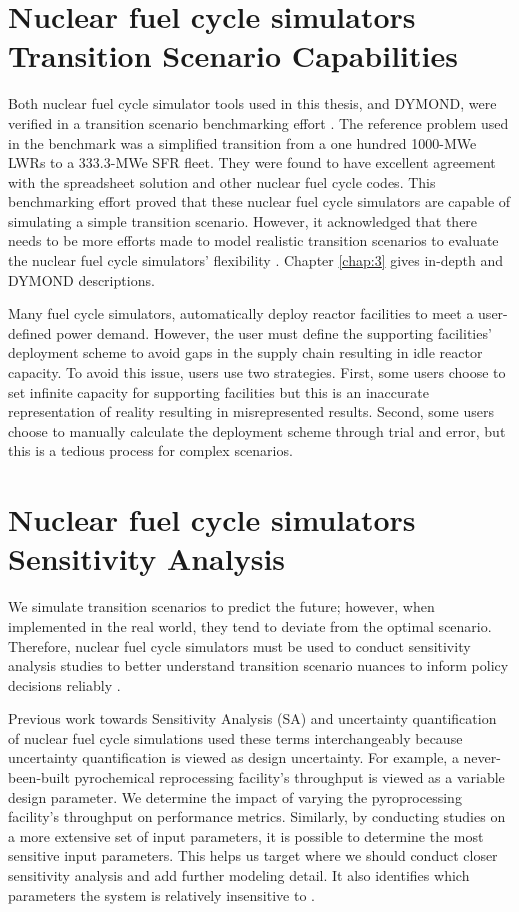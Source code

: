 \section{Nuclear fuel cycle simulators Transition Scenario Capabilities}
Both nuclear fuel cycle simulator tools used in this thesis, \Cyclus and DYMOND,
were verified in a transition scenario benchmarking effort
\cite{feng_standardized_2016,bae_standardized_2019}.
The reference problem used in the benchmark was a simplified 
transition from a one hundred 1000-MWe \glspl{LWR} to a 
333.3-MWe \gls{SFR} fleet. 
They were found to have excellent agreement with the 
spreadsheet solution and other nuclear fuel cycle codes.  
This benchmarking effort proved that these nuclear fuel cycle simulators
are capable of simulating a simple transition scenario. 
However, it acknowledged that there needs to be more efforts 
made to model realistic transition scenarios to evaluate
the nuclear fuel cycle simulators' flexibility \cite{feng_standardized_2016}.
Chapter \ref{chap:3} gives in-depth \Cyclus and DYMOND descriptions.

Many fuel cycle simulators, automatically deploy reactor facilities 
to meet a user-defined power demand. 
However, the user must define the supporting facilities' 
deployment scheme to avoid gaps in the supply 
chain resulting in idle reactor capacity. 
To avoid this issue, users use two strategies. 
First, some users choose to set infinite capacity 
for supporting facilities but this is an inaccurate 
representation of reality resulting in misrepresented results. 
Second, some users choose to manually calculate the deployment 
scheme through trial and error, but this is a tedious process 
for complex scenarios. 

\section{Nuclear fuel cycle simulators Sensitivity Analysis}
We simulate transition scenarios to predict the future; 
however, when implemented in the real world, they tend to deviate 
from the optimal scenario.
Therefore, nuclear fuel cycle simulators must be used to conduct
sensitivity analysis studies to better understand 
transition scenario nuances to inform policy decisions reliably
\cite{passerini_systematic_2014}. 

Previous work towards Sensitivity Analysis (SA) and uncertainty quantification of 
nuclear fuel cycle simulations used these terms interchangeably
because uncertainty quantification is viewed as design uncertainty.
For example, a never-been-built pyrochemical reprocessing 
facility's throughput is viewed as a variable design parameter.
We determine the impact of varying the pyroprocessing 
facility's throughput on performance metrics.
Similarly, by conducting studies on a more extensive set of input 
parameters, it is possible to determine the most sensitive input 
parameters.
This helps us target where we should conduct closer 
sensitivity analysis and add further modeling detail.
It also identifies which parameters the system is relatively 
insensitive to \cite{noauthor_effects_2017}. 

